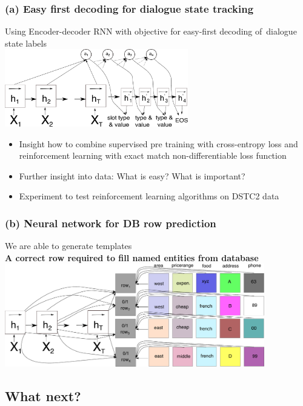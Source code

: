 \documentclass[10pt, compress,british,xcolor={svgnames,dvipsnames,x11names},trans]{beamer}
\begin{document}
\begin{frame}\frametitle{(a) Easy first decoding for dialogue state tracking}
    Using Encoder-decoder RNN with objective for easy-first decoding of~dialogue state labels  \\
    \includegraphics[width=0.6\textwidth]{encdec_easy}
    \begin{itemize}
        \item Insight how to combine supervised pre training with cross-entropy loss and reinforcement learning with exact match non-differentiable loss function
        \item Further insight into data: What is easy? What is important?
        \item Experiment to test reinforcement learning algorithms on DSTC2 data
    \end{itemize}
\end{frame}

\begin{frame}\frametitle{(b) Neural network for DB row prediction}
    \begin{center}
    We are able to generate templates \\
    {\bf A correct row required to fill named entities from database}
        \vfill
    \includegraphics[width=0.85\textwidth]{./e2end_dbclassifiers}
    \end{center}
\end{frame}


\subsection{What next?}  %
\end{document}
